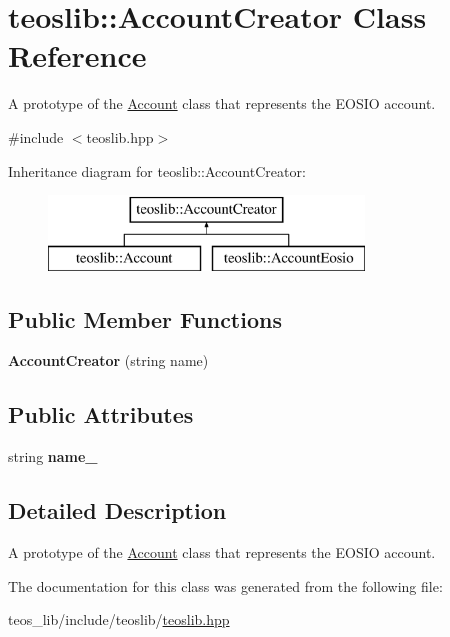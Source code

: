 \hypertarget{classteoslib_1_1_account_creator}{}\section{teoslib\+:\+:Account\+Creator Class Reference}
\label{classteoslib_1_1_account_creator}


A prototype of the \mbox{\hyperlink{classteoslib_1_1_account}{Account}} class that represents the E\+O\+S\+IO account.  




{\ttfamily \#include $<$teoslib.\+hpp$>$}

Inheritance diagram for teoslib\+:\+:Account\+Creator\+:\begin{figure}[H]
\begin{center}
\leavevmode
\includegraphics[height=2.000000cm]{classteoslib_1_1_account_creator}
\end{center}
\end{figure}
\subsection*{Public Member Functions}
\begin{DoxyCompactItemize}
\item 
\mbox{\label{classteoslib_1_1_account_creator_a46505248b199e06552a9f10beff51246}} 
{\bfseries Account\+Creator} (string name)
\end{DoxyCompactItemize}
\subsection*{Public Attributes}
\begin{DoxyCompactItemize}
\item 
\mbox{\label{classteoslib_1_1_account_creator_a1e0ed5f1141c818e965a7581fe034199}} 
string {\bfseries name\+\_\+}
\end{DoxyCompactItemize}


\subsection{Detailed Description}
A prototype of the \mbox{\hyperlink{classteoslib_1_1_account}{Account}} class that represents the E\+O\+S\+IO account. 

The documentation for this class was generated from the following file\+:\begin{DoxyCompactItemize}
\item 
teos\+\_\+lib/include/teoslib/\mbox{\hyperlink{teoslib_8hpp}{teoslib.\+hpp}}\end{DoxyCompactItemize}
